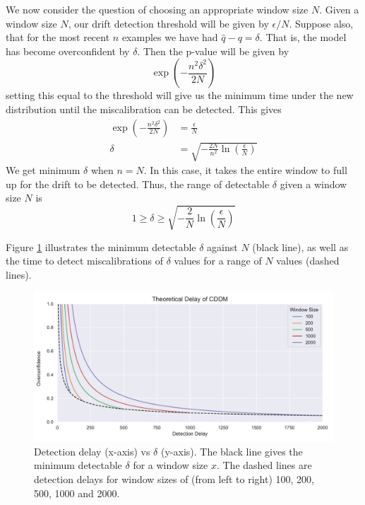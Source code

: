 We now consider the question of choosing an appropriate window size $N$. Given a window size $N$, our drift detection threshold will be given by $\epsilon/N$. Suppose also, that for the most recent $n$ examples we have had $\hat{q}-q=\delta$. That is, the model has become overconfident by $\delta$. Then the p-value will be given by
\begin{equation}
    \exp\left(-\frac{n^2\delta^2}{2N}\right)
\end{equation}
setting this equal to the threshold will give us the minimum time under the new distribution until the miscalibration can be detected. This gives
\begin{align}
    \exp\left(-\frac{n^2\delta^2}{2N}\right) &= \frac{\epsilon}{N} \\
    \delta &= \sqrt{-\frac{2N}{n^2}\ln\left(\frac{\epsilon}{N}\right)}
\end{align}
We get minimum $\delta$ when $n=N$. In this case, it takes the entire window to full up for the drift to be detected. Thus, the range of detectable $\delta$ given a window size $N$ is
\begin{equation}
    1 \ge \delta \ge \sqrt{-\frac{2}{N}\ln\left(\frac{\epsilon}{N}\right)} \label{eq:window_size}
\end{equation}

Figure \ref{fig:cddm_window_size} illustrates the minimum detectable $\delta$ against $N$ (black line), as well as the time to detect miscalibrations of $\delta$ values for a range of $N$ values (dashed lines).

\begin{figure}
    \centering
    \includegraphics[width=\textwidth]{images/cddm_window_size.pdf}
    \caption{Detection delay (x-axis) vs $\delta$ (y-axis). The black line gives the minimum detectable $\delta$ for a window size $x$. The dashed lines are detection delays for window sizes of (from left to right) 100, 200, 500, 1000 and 2000.}
    \label{fig:cddm_window_size}
\end{figure}

